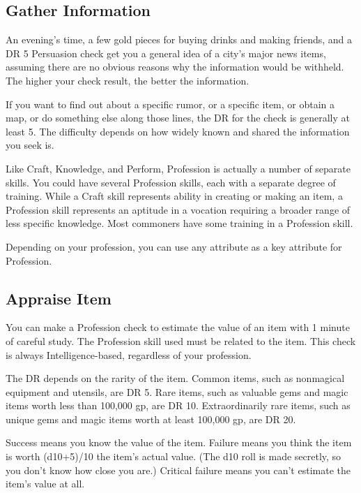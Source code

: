     \subsection{Gather Information}
        An evening's time, a few gold pieces for buying drinks and making friends, and a DR 5 Persuasion check get you a general idea of a city's major news items, assuming there are no obvious reasons why the information would be withheld. The higher your check result, the better the information.

        If you want to find out about a specific rumor, or a specific item, or obtain a map, or do something else along those lines, the DR for the check is generally at least 5.
        The difficulty depends on how widely known and shared the information you seek is.

\newpage
{}
        Like Craft, Knowledge, and Perform, Profession is actually a number of separate skills.
        You could have several Profession skills, each with a separate degree of training.
        While a Craft skill represents ability in creating or making an item, a Profession skill represents an aptitude in a vocation requiring a broader range of less specific knowledge.
        Most commoners have some training in a Profession skill.

        Depending on your profession, you can use any attribute as a key attribute for Profession.

    \subsection{Appraise Item}
        You can make a Profession check to estimate the value of an item with 1 minute of careful study. The Profession skill used must be related to the item.
        This check is always Intelligence-based, regardless of your profession.

        The DR depends on the rarity of the item. Common items, such as nonmagical equipment and utensils, are DR 5. Rare items, such as valuable gems and magic items worth less than 100,000 gp, are DR 10. Extraordinarily rare items, such as unique gems and magic items worth at least 100,000 gp, are DR 20.

        Success means you know the value of the item. Failure means you think the item is worth (d10+5)/10 \x the item's actual value. (The d10 roll is made secretly, so you don't know how close you are.) Critical failure means you can't estimate the item's value at all.

